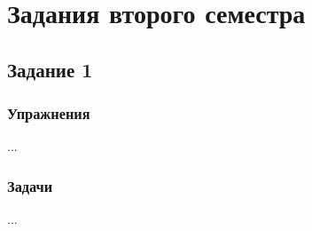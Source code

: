 \chapter{Задания второго семестра}

\section{Задание 1}

\subsection*{\hfil Упражнения \hfil}
%
\begin{exercise}
\item ...
\end{exercise}

\subsection*{\hfil Задачи \hfil}
%
\begin{problem}
\item ...
\end{problem}